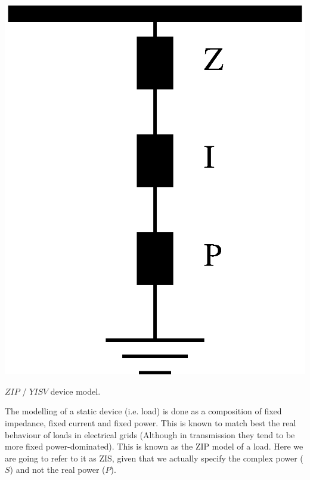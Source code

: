 \documentclass[nols,a4paper,twoside,notoc,fleqn]{tufte-book}
\begin{document}
\begin{marginfigure}
	\includegraphics[width=0.99\linewidth]{img/ZIP_model.eps}
	\caption{$ZIP$ / $YISV$ device model.}
	\label{zip_model}
\end{marginfigure}

The modelling of a static device (i.e. load) is done as a composition of fixed impedance, fixed current and fixed power. This is known to match best the real behaviour of loads in electrical grids (Although in transmission they tend to be more fixed power-dominated). This is known as the ZIP model of a load. Here we are going to refer to it as ZIS, given that we actually specify the complex power ($S$) and not the real power ($P$).
\end{document}
